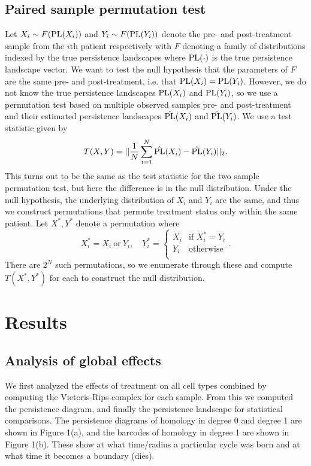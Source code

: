 \documentclass[11pt]{article}
\begin{document}
\subsection{Paired sample permutation test}

Let $X_i \sim F({\rm PL}(X_i))$ and $Y_i \sim F({\rm PL}(Y_i))$ denote the pre- and post-treatment sample from the $i$th patient respectively with $F$ denoting a family of distributions indexed by the true persistence landscapes where ${\rm PL}(\cdot)$ is the true persistence landscape vector. We want to test the null hypothesis that the parameters of $F$ are the same pre- and post-treatment, i.e. that ${\rm PL}(X_i) = {\rm PL}(Y_i)$. However, we do not know the true persistence landscapes ${\rm PL}(X_i)$ and ${\rm PL}(Y_i)$, so we use a permutation test based on multiple observed samples pre- and post-treatment and their estimated persistence landscapes $\hat{{\rm PL}}(X_i)$ and $\hat{{\rm PL}}(Y_i)$. We use a test statistic given by
$$
T(X, Y) = ||\frac{1}{N}\sum_{i = 1}^{N} \hat{{\rm PL}}(X_i) -  \hat{{\rm PL}}(Y_i) ||_2.
$$
This turns out to be the same as the test statistic for the two sample permutation test, but here the difference is in the null distribution. Under the null hypothesis, the underlying distribution of $X_i$ and $Y_i$ are the same, and thus we construct permutations that permute treatment status only within the same patient. Let $X^*, Y^*$ denote a permutation where
$$
X^*_i = X_i~\text{or}~Y_i, \quad
Y^*_i =   \begin{cases}
               	X_i & \text{if $X^*_i = Y_i$} \\
                  Y_i & \text{otherwise} \\
 			 \end{cases}.
$$
There are $2^N$ such permutations, so we enumerate through these and compute $T(X^*, Y^*)$ for each to construct the null distribution.

\section{Results}

\subsection{Analysis of global effects}
We first analyzed the effects of treatment on all cell types combined by computing the Vietoris-Rips complex for each sample. From this we computed the persistence diagram, and finally the persistence landscape for statistical comparisons. The persistence diagrams of homology in degree 0 and degree 1 are shown in Figure 1(a), and the barcodes of homology in degree 1 are shown in Figure 1(b). These show at what time/radius a particular cycle was born and at what time it becomes a boundary (dies). 
\end{document}
